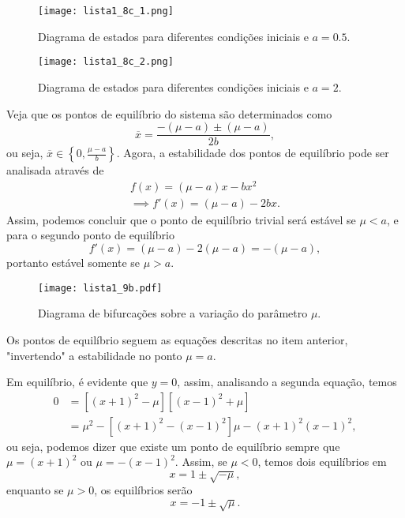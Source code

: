 \documentclass[a4paper]{report}
\begin{document}

\begin{figure}[H]
    \centering
    \texttt{[image: lista1\_8c\_1.png]}
    \caption{Diagrama de estados para diferentes condições iniciais e $a=0.5$.}
    \label{fig:}
\end{figure}

\begin{figure}[H]
    \centering
    \texttt{[image: lista1\_8c\_2.png]}
    \caption{Diagrama de estados para diferentes condições iniciais e $a=2$.}
    \label{fig:lista1_8c_2-png}
\end{figure}



Veja que os pontos de equilíbrio do sistema são determinados como \[
    \overline{x} = \frac{-\left( \mu-a \right) \pm \left( \mu-a \right) }{2b}
,\] ou seja, $\overline{x} \in  \left\{ 0, \frac{\mu -a}{b} \right\} $. Agora, a estabilidade dos pontos de equilíbrio pode ser analisada através de
\begin{align*}
    f(x) = \left( \mu-a \right) x -bx^2 \\
    \implies f'(x) = \left( \mu-a \right) -2bx
.\end{align*}
Assim, podemos concluir que o ponto de equilíbrio trivial será estável se $\mu<a$, e para o segundo ponto de equilíbrio \[
    f'(x) = \left( \mu-a \right) -2\left( \mu -a\right) = -\left( \mu-a \right) 
,\] portanto estável somente se $\mu>a$.


\begin{figure}[H]
    \centering
    \texttt{[image: lista1\_9b.pdf]}
    \caption{Diagrama de bifurcações sobre a variação do parâmetro $\mu$.}
    \label{fig:lista1_9b-pdf}
\end{figure}

Os pontos de equilíbrio seguem as equações descritas no item anterior, "invertendo" a estabilidade no ponto $\mu=a$.



Em equilíbrio, é evidente que $y=0$, assim, analisando a segunda equação, temos
\begin{align*}
    0 &= \left[ \left( x+1 \right)^2 -\mu  \right] \left[ \left( x-1 \right)^2 +\mu \right] \\
      &= \mu^2 -\left[ \left( x+1 \right)^2 -\left( x-1 \right)^2  \right] \mu -\left( x+1 \right) ^2\left( x-1 \right) ^2
,\end{align*}
ou seja, podemos dizer que existe um ponto de equilíbrio sempre que $\mu =  \left( x+1 \right) ^2$ ou $\mu = -\left( x-1 \right) ^2$. Assim, se $\mu<0$, temos dois equilíbrios em \[
x = 1\pm\sqrt{-\mu} 
,\] enquanto se $\mu > 0$, os equilíbrios serão \[
x = -1 \pm\sqrt{\mu} 
.\] 
\end{document}
